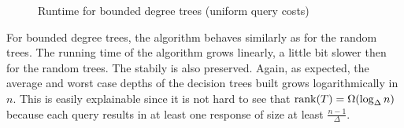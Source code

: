 \begin{figure}[!h]
\centering
{}
\caption{Runtime for bounded degree trees (uniform query costs)}
\label{fig:bounded_degree_uniform_time}
\end{figure}

\FloatBarrier

For bounded degree trees, the algorithm behaves similarly as for the random trees. The running time of the algorithm grows linearly, a little bit slower then for the random trees. The stabily is also preserved. Again, as expected, the average and worst case depths of the decision trees built grows logarithmically in $n$. This is easily explainable since it is not hard to see that $\operatorname{rank}\mathopen{}\left( T \right) = \Omega\mathopen{}\left( \log_{\Delta} n \right)$ because each query results in at least one response of size at least $\frac{n-1}{\Delta}$.